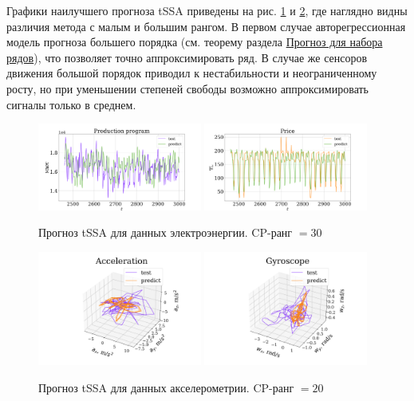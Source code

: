 			Графики наилучшего прогноза tSSA приведены на рис. \ref{fig:tssa_electr_pred} и \ref{fig:tssa_motion_pred}, где наглядно видны различия метода с малым и большим рангом. В первом случае авторегрессионная модель прогноза большего порядка (см. теорему раздела \hyperref[sec:tssa_forecast]{Прогноз для набора рядов}), что позволяет точно аппроксимировать ряд. В случае же сенсоров движения большой порядок приводил к нестабильности и неограниченному росту, но при уменьшении степеней свободы возможно аппроксимировать сигналы только в среднем.
			
			\begin{figure}[h]
				\centering
				\includegraphics[width=0.48\textwidth, keepaspectratio]{../experiments/electricity/tssa/figs/prediction/cpd_rank_30/Production_program.png}
				\includegraphics[width=0.48\textwidth, keepaspectratio]{../experiments/electricity/tssa/figs/prediction/cpd_rank_30/Price.png}
				\caption{Прогноз tSSA для данных электроэнергии. CP-ранг $ = 30 $}\label{fig:tssa_electr_pred}
			\end{figure}
			
			\begin{figure}[h]
				\centering
				\includegraphics[width=0.48\textwidth, keepaspectratio]{../experiments/motion_1/tssa/figs/prediction/cpd_rank_20/acceler.png}
				\includegraphics[width=0.48\textwidth, keepaspectratio]{../experiments/motion_1/tssa/figs/prediction/cpd_rank_20/gyro.png}
				\caption{Прогноз tSSA для данных акселерометрии. CP-ранг $ = 20 $}\label{fig:tssa_motion_pred}
			\end{figure}
			
